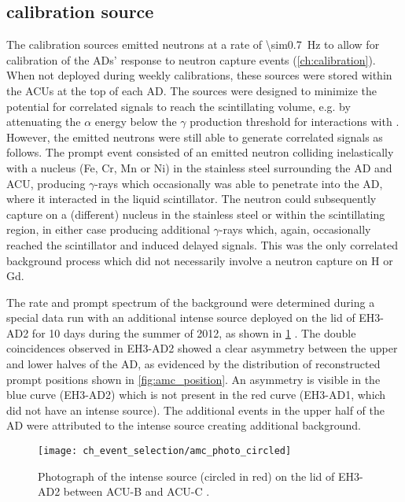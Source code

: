 \subsection{\texorpdfstring{\amcbold}{Am-C} calibration source}
\label{subsec:amc}

The \amc{} calibration sources emitted neutrons at a rate of \SI{\sim0.7}{\Hz}
to allow for calibration of the ADs' response to neutron capture events
(\cref{ch:calibration}).
When not deployed during weekly calibrations, these sources
were stored within the ACUs at the top of each AD.
The sources were designed to minimize
the potential for correlated signals to reach the scintillating volume,
e.g. by attenuating the $\alpha$ energy below the $\gamma$ production
threshold for interactions with  \cite{ngd2016}.
However, the emitted neutrons were still able to generate
correlated signals as follows.
The prompt event consisted of an emitted neutron colliding inelastically
with a nucleus (Fe, Cr, Mn or Ni) in the stainless steel surrounding the AD and ACU,
producing $\gamma$-rays which occasionally was able to penetrate
into the AD, where it interacted in the liquid scintillator.
The neutron could subsequently capture on a (different) nucleus
in the stainless steel or within the scintillating region,
in either case producing additional $\gamma$-rays
which, again, occasionally reached the scintillator and induced delayed signals.
This was the only correlated background process
which did not necessarily involve a neutron capture on H or Gd.

The rate and prompt spectrum of the \amc{} background were determined
during a special data run with an additional intense \amc{} source
deployed on the lid of EH3-AD2 for 10 days during the summer of 2012,
as shown in \cref{fig:amc_photo} \cite{nh2016technote}.
The double coincidences observed in EH3-AD2 showed a clear asymmetry
between the upper and lower halves of the AD,
as evidenced by the distribution of reconstructed prompt positions
shown in \cref{fig:amc_position}.
An asymmetry is visible in the blue curve (EH3-AD2)
which is not present in the red curve
(EH3-AD1, which did not have an intense \amc{} source).
The additional events in the upper half of the AD
were attributed to the intense \amc{} source creating additional background.

\begin{figure}
    \centering
    \texttt{[image: ch\_event\_selection/amc\_photo\_circled]}
    \caption{
        Photograph of the intense \amc{} source (circled in red)
        on the lid of EH3-AD2 between ACU-B and ACU-C \cite{amc_photo}.
    }
    \label{fig:amc_photo}
\end{figure}

